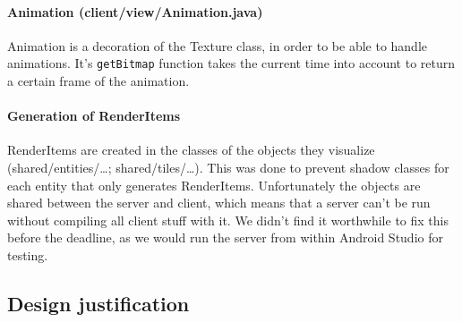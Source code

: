 \documentclass[../main.tex]{subfiles}
\begin{document}
        \paragraph{Animation (\tiny client/view/Animation.java\normalsize)} Animation is a decoration of the Texture class, in order to be able to handle animations. It's \texttt{getBitmap} function takes the current time into account to return a certain frame of the animation.

        \paragraph{Generation of RenderItems} RenderItems are created in the classes of the objects they visualize (\tiny shared/entities/\dots; shared/tiles/\dots\normalsize). This was done to prevent shadow classes for each entity that only generates RenderItems. Unfortunately the objects are shared between the server and client, which means that a server can't be run without compiling all client stuff with it. We didn't find it worthwhile to fix this before the deadline, as we would run the server from within Android Studio for testing. 

	\subsection{Design justification}
\end{document}
